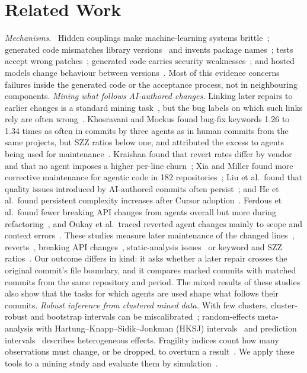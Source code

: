 \documentclass[runningheads]{llncs}
\newcommand{\runin}[1]{\par\textit{#1}\ }
\begin{document}
\section{Related Work}

\runin{Mechanisms.} Hidden couplings make machine-learning systems brittle~\cite{sculley2015}; generated code mismatches library versions~\cite{misra2026} and invents package names~\cite{spracklen2025}; tests accept wrong patches~\cite{wang2026,liu2023}; generated code carries security weaknesses~\cite{pearce2022,fu2025}; and hosted models change behaviour between versions~\cite{chen2024}. Most of this evidence concerns failures inside the generated code or the acceptance process, not in neighbouring components. \textit{Mining what follows AI-authored changes.} Linking later repairs to earlier changes is a standard mining task~\cite{sliwerski2005}, but the bug labels on which such links rely are often wrong~\cite{herzig2013}. Khosravani and Mockus found bug-fix keywords 1.26 to 1.34 times as often in commits by three agents as in human commits from the same projects, but SZZ ratios below one, and attributed the excess to agents being used for maintenance~\cite{khosravani2026}. Kraishan found that revert rates differ by vendor and that no agent imposes a higher per-line churn~\cite{kraishan2026}; Xia and Miller found more corrective maintenance for agentic code in 182 repositories~\cite{xia2026}; Liu et al.\ found that quality issues introduced by AI-authored commits often persist~\cite{liu2026}; and He et al.\ found persistent complexity increases after Cursor adoption~\cite{he2026}. Ferdous et al.\ found fewer breaking API changes from agents overall but more during refactoring~\cite{ferdous2026}, and Oukay et al.\ traced reverted agent changes mainly to scope and context errors~\cite{oukay2026}. These studies measure later maintenance of the changed lines~\cite{kraishan2026,xia2026}, reverts~\cite{oukay2026}, breaking API changes~\cite{ferdous2026}, static-analysis issues~\cite{liu2026,he2026} or keyword and SZZ ratios~\cite{khosravani2026}. Our outcome differs in kind: it asks whether a later repair crosses the original commit's file boundary, and it compares marked commits with matched commits from the same repository and period. The mixed results of these studies also show that the tasks for which agents are used shape what follows their commits. \textit{Robust inference from clustered mined data.} With few clusters, cluster-robust and bootstrap intervals can be miscalibrated~\cite{cameron2008}; random-effects meta-analysis with Hartung--Knapp--Sidik--Jonkman (HKSJ) intervals~\cite{inthout2014} and prediction intervals~\cite{higgins2009} describes heterogeneous effects. Fragility indices count how many observations must change, or be dropped, to overturn a result~\cite{walsh2014,broderick2020}. We apply these tools to a mining study and evaluate them by simulation~\cite{morris2019}.
\end{document}
